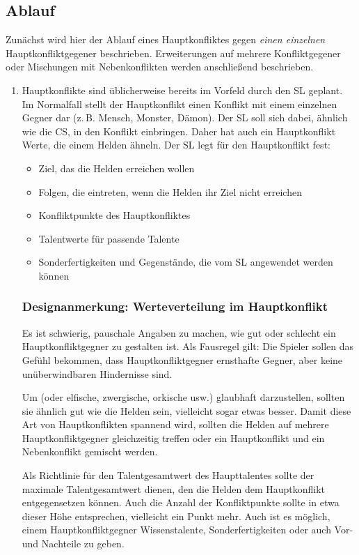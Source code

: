 \subsection{Ablauf}
Zunächst wird hier der Ablauf eines Hauptkonfliktes gegen \emph{einen einzelnen}  Hauptkonfliktgegener beschrieben. Erweiterungen auf mehrere Konfliktgegener oder Mischungen mit Nebenkonflikten werden anschließend beschrieben.
\begin{enumerate}
  \item Hauptkonflikte sind üblicherweise bereits im Vorfeld durch den SL geplant. Im Normalfall stellt der Hauptkonflikt einen Konflikt mit einem einzelnen Gegner dar (z.\,B. Mensch, Monster, Dämon). Der SL soll sich dabei, ähnlich wie die CS, in den Konflikt einbringen. Daher hat auch ein Hauptkonflikt Werte, die einem Helden ähneln. Der SL legt für den Hauptkonflikt fest:
\begin{itemize}
\item Ziel, das die Helden erreichen wollen
\item Folgen, die eintreten, wenn die Helden ihr Ziel nicht erreichen
\item Konfliktpunkte des Hauptkonfliktes
\item Talentwerte für passende Talente
\item Sonderfertigkeiten und Gegenstände, die vom SL angewendet werden können
\end{itemize}

\begin{design}
\subsubsection{Designanmerkung: Werteverteilung im Hauptkonflikt}
Es ist schwierig, pauschale Angaben zu machen, wie gut oder schlecht ein Hauptkonfliktgegner zu gestalten ist. Als Fausregel gilt: Die Spieler sollen das Gefühl bekommen, dass Hauptkonfliktgegner ernsthafte Gegner, aber keine unüberwindbaren Hindernisse sind.

Um  (oder elfische, zwergische, orkische usw.) glaubhaft darzustellen, sollten sie ähnlich gut wie die Helden sein, vielleicht sogar etwas besser. Damit diese Art von Hauptkonflikten spannend wird, sollten die Helden auf mehrere Hauptkonfliktgegner gleichzeitig treffen oder ein Hauptkonflikt und ein Nebenkonflikt gemischt werden.

Als Richtlinie für den Talentgesamtwert des Haupttalentes sollte der maximale Talentgesamtwert dienen, den die Helden dem Hauptkonflikt entgegensetzen können. Auch die Anzahl der Konfliktpunkte sollte in etwa dieser Höhe entsprechen, vielleicht ein Punkt mehr. Auch ist es möglich, einem Hauptkonfliktgegner Wissenstalente, Sonderfertigkeiten oder auch Vor- und Nachteile zu geben.


\end{design}
\end{enumerate}
